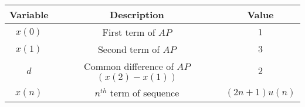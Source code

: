\begin{tabular}{|c|c|c|} 
      \hline
\textbf{Variable}& \textbf{Description}& \textbf{Value}\\\hline
        $x(0)$ & First term of $AP$ & $1$ \\ \hline
        $x(1)$& Second term of $AP$ & $3$ \\ \hline
         $d$ & Common difference of $AP$ $(x(2)-x(1))$ & $2$ \\ \hline
          $x(n)$& $n^{th}$ term of sequence& $(2n+1)u(n)$\\ \hline 
          
    \end{tabular}